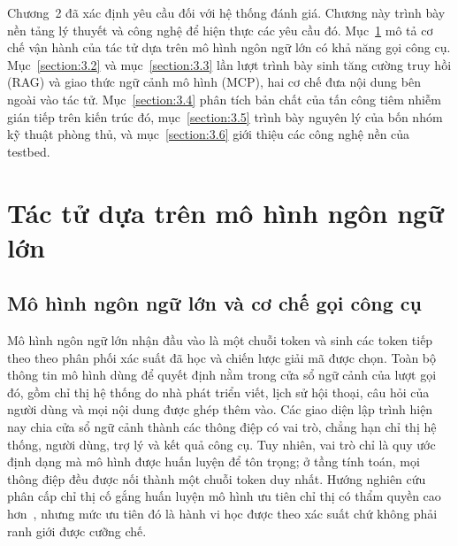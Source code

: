 \documentclass[../DoAn.tex]{subfiles}
\begin{document}

Chương~2 đã xác định yêu cầu đối với hệ thống đánh giá. Chương này trình bày nền tảng lý thuyết và công nghệ để hiện thực các yêu cầu đó. Mục~\ref{section:3.1} mô tả cơ chế vận hành của tác tử dựa trên mô hình ngôn ngữ lớn có khả năng gọi công cụ. Mục~\ref{section:3.2} và mục~\ref{section:3.3} lần lượt trình bày sinh tăng cường truy hồi (RAG) và giao thức ngữ cảnh mô hình (MCP), hai cơ chế đưa nội dung bên ngoài vào tác tử. Mục~\ref{section:3.4} phân tích bản chất của tấn công tiêm nhiễm gián tiếp trên kiến trúc đó, mục~\ref{section:3.5} trình bày nguyên lý của bốn nhóm kỹ thuật phòng thủ, và mục~\ref{section:3.6} giới thiệu các công nghệ nền của testbed.

\section{Tác tử dựa trên mô hình ngôn ngữ lớn}
\label{section:3.1}

\subsection{Mô hình ngôn ngữ lớn và cơ chế gọi công cụ}
\label{subsection:3.1.1}

Mô hình ngôn ngữ lớn nhận đầu vào là một chuỗi token và sinh các token tiếp theo theo phân phối xác suất đã học và chiến lược giải mã được chọn. Toàn bộ thông tin mô hình dùng để quyết định nằm trong cửa sổ ngữ cảnh của lượt gọi đó, gồm chỉ thị hệ thống do nhà phát triển viết, lịch sử hội thoại, câu hỏi của người dùng và mọi nội dung được ghép thêm vào. Các giao diện lập trình hiện nay chia cửa sổ ngữ cảnh thành các thông điệp có vai trò, chẳng hạn chỉ thị hệ thống, người dùng, trợ lý và kết quả công cụ. Tuy nhiên, vai trò chỉ là quy ước định dạng mà mô hình được huấn luyện để tôn trọng; ở tầng tính toán, mọi thông điệp đều được nối thành một chuỗi token duy nhất. Hướng nghiên cứu phân cấp chỉ thị cố gắng huấn luyện mô hình ưu tiên chỉ thị có thẩm quyền cao hơn~\cite{wallace2024instruction}, nhưng mức ưu tiên đó là hành vi học được theo xác suất chứ không phải ranh giới được cưỡng chế.
\end{document}
